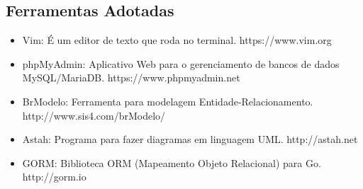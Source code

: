 \documentclass[12pt]{article}
\begin{document}
	\subsection{Ferramentas Adotadas}

	\begin{itemize}
		\item Vim: É um editor de texto que roda no terminal. https://www.vim.org
		\item phpMyAdmin: Aplicativo Web para o gerenciamento de bancos de dados MySQL/MariaDB. https://www.phpmyadmin.net
		\item BrModelo: Ferramenta para modelagem Entidade-Relacionamento. http://www.sis4.com/brModelo/
		\item Astah: Programa para fazer diagramas em linguagem UML. http://astah.net
		\item GORM: Biblioteca ORM (Mapeamento Objeto Relacional) para Go. http://gorm.io
	\end{itemize}

	\newpage
\end{document}
